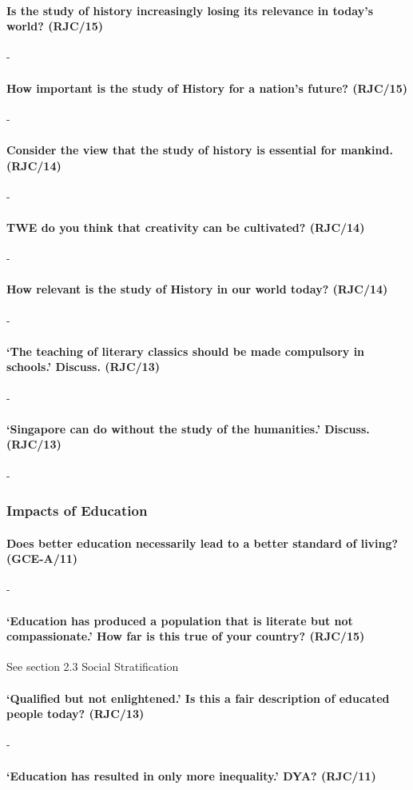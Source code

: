 \documentclass[../../main]{subfiles}
\begin{document}
\paragraph{Is the study of history increasingly losing its relevance in today's world? (RJC/15)}-

\paragraph{How important is the study of History for a nation's future? (RJC/15)}-

\paragraph{Consider the view that the study of history is essential for mankind. (RJC/14)}-

\paragraph{TWE do you think that creativity can be cultivated? (RJC/14)}-

\paragraph{How relevant is the study of History in our world today? (RJC/14)}-

\paragraph{`The teaching of literary classics should be made compulsory in schools.' Discuss. (RJC/13)}-

\paragraph{`Singapore can do without the study of the humanities.' Discuss. (RJC/13)}-


\subsubsection{Impacts of Education}

\paragraph{Does better education necessarily lead to a better standard of living? (GCE-A/11)}-

\paragraph{`Education has produced a population that is literate but not compassionate.' How far is this true of your country? (RJC/15)} See section 2.3 Social Stratification

\paragraph{`Qualified but not enlightened.' Is this a fair description of educated people today? (RJC/13)}-

\paragraph{`Education has resulted in only more inequality.' DYA? (RJC/11)}
\end{document}
